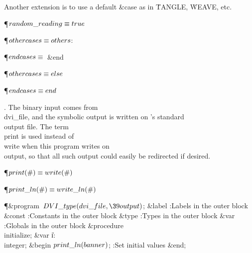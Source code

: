 Another extension is to use a default   \&{case}  as in \.{TANGLE}, \.{WEAVE},
etc.

\Y\P\D {}$\\{random\_reading}\S\\{true}$%
\par
\P\D {}$\\{othercases}\S\\{others}$: \par
\P\D {}$\\{endcases}\S$\ \&{end} \par
\P\F {}$\\{othercases}\S\\{else}$\par
\P\F {}$\\{endcases}\S\\{end}$\par
\fi

. The binary input comes from \\{dvi\_file}, and the symbolic output is
written
on \PASCAL's standard \\{output} file. The term \\{print} is used instead of
\\{write} when this program writes on \\{output}, so that all such output
could easily be redirected if desired.

\Y\P\D {}$\\{print}(\#)\S\\{write}(\#)$\par
\P\D {}$\\{print\_ln}(\#)\S\\{write\_ln}(\#)$\par
\Y\P\4\&{program}\1\  $\\{DVI\_type}(\\{dvi\_file},\39\\{output})$;\6
\4\&{label} :Labels in the outer block\X\6
\4\&{const} :Constants in the outer block\X\6
\4\&{type} :Types in the outer block\X\6
\4\&{var} :Globals in the outer block\X\6
\4\&{procedure}\1\  \\{initialize};\6
\4\&{var} \|i: \\{integer};\2\6
\&{begin} $\\{print\_ln}(\\{banner})$;\6
:Set initial values\X\6
\&{end};\par
\fi

